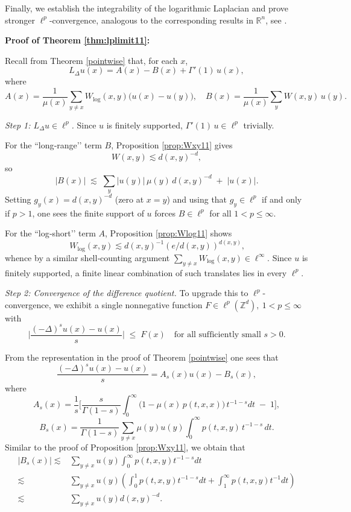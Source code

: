 \documentclass[reqno,12pt]{amsart}
\numberwithin{equation}{section}
\begin{document}
Finally, we establish the integrability of the logarithmic Laplacian and prove stronger \(\ell^p\)-convergence, analogous to the corresponding results in \(\mathbb{R}^n\), see \cite[Theorem 1.1]{chen2019dirichlet}.

	\vspace{1\baselineskip}
	
\noindent \textbf{Proof of Theorem \ref{thm:lplimit11}:}


	Recall from Theorem \ref{pointwise} that, for each \(x\),
	\[
	L_{\Delta}u(x)
	= A(x) - B(x) + \Gamma'(1)\,u(x),
	\]
	where
	\[
	A(x)
	=\frac{1}{\mu(x)}
	\sum_{y\neq x}W_{\log}(x,y)\bigl(u(x)-u(y)\bigr),
	\quad
	B(x)
	=\frac{1}{\mu(x)}
	\sum_{y}W(x,y)\,u(y).
	\]
	
	\medskip\noindent\emph{Step 1: \(L_{\Delta}u\in\ell^p\).}  Since \(u\) is finitely supported, \(\Gamma'(1)\,u\in\ell^p\) trivially.  
	
	For the “long‐range’’ term \(B\), Proposition \ref{prop:Wxy11} gives
	\[
	W(x,y)\lesssim d(x,y)^{-d},
	\]
	so
	\[
	|B(x)|
	\;\lesssim\;
	\sum_{y}|u(y)|\,\mu(y)\,d(x,y)^{-d}
	\;+\;|u(x)|.
	\]
	Setting \(g_y(x)=d(x,y)^{-d}\) (zero at \(x=y\)) and using that \(g_y\in\ell^p\) if and only if \(p>1\), one sees the finite support of \(u\) forces \(B\in\ell^p\) for all \(1<p\le\infty\).  
	
	For the “log‐short’’ term \(A\), Proposition \ref{prop:Wlog11} shows
	$$\,W_{\log}(x,y)\lesssim d(x,y)^{-1}(e/d(x,y))^{d(x,y)},$$
	whence by a similar shell‐counting argument
	\(\sum_{y\neq x}W_{\log}(x,y)\in\ell^\infty\).  Since \(u\) is finitely supported, a finite linear combination of such translates lies in every \(\ell^p\). 
	
\medskip\noindent\emph{Step 2: Convergence of the difference quotient.}  
 To upgrade this to \(\ell^p\)-convergence, we exhibit a single nonnegative function \(F\in\ell^p(\mathbb{Z}^d),\:1<p\le \infty\) with
\[
\biggl|\frac{(-\Delta)^s u(x)-u(x)}{s}\biggr|
\;\le\;
F(x)
\quad\text{for all sufficiently small }s>0.
\]

From the representation in the proof of Theorem \ref{pointwise} one sees that
\[
\frac{(-\Delta)^s u(x)-u(x)}{s}
= A_s(x)u(x) - B_s(x),
\]
where
\[
	A_s(x)
=\frac{1}{s}\Biggl[
\frac{s}{\Gamma(1-s)}
\int_{0}^{\infty}\bigl(1-\mu(x)\,p(t,x,x)\bigr)\,t^{-1-s}dt
\;-\;1
\Biggr],
\]
\[
B_s(x)
=\frac{1}{\Gamma\left(1-s\right)}\sum_{y\ne x} \mu(y)u(y)\!\int_0^\infty p(t,x,y)\,t^{-1-s}\,dt.
\]
Similar to the proof of Proposition \ref{prop:Wxy11}, we obtain that
\[\begin{aligned}
	\left|B_{s}\left(x\right)\right|\lesssim&  \sum_{y\ne x}u\left(y\right)\int_0^{\infty}p\left(t,x,y\right)t^{-1-s}dt \\ \lesssim& \sum_{y\ne x}u\left(y\right)\left(\int_0^{1}p\left(t,x,y\right)t^{-1-s}dt+\int_1^{\infty}p\left(t,x,y\right)t^{-1}dt\right)\\ \lesssim &  \sum_{y\ne x}u\left(y\right)d\left(x,y\right)^{-d}.
\end{aligned}\]
\end{document}
